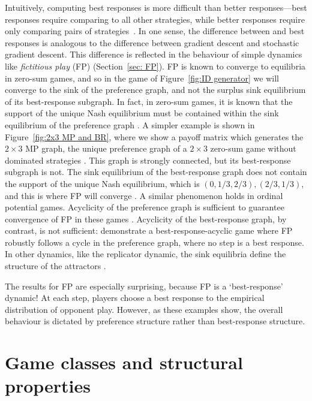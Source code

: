 \documentclass[preprint,authoryear]{elsarticle}
\begin{document}
Intuitively, computing best responses is more difficult than better responses---best responses require comparing to all other strategies, while better responses require only comparing pairs of strategies~\citep{sandholm2010population}. In one sense, the difference between and best responses is analogous to the difference between gradient descent and stochastic gradient descent. This difference is reflected in the behaviour of simple dynamics like \emph{fictitious play} (FP) (Section~\ref{sec: FP}). FP is known to converge to equilibria in zero-sum games, and so in the game of Figure~\ref{fig:ID generator} we will converge to the sink of the preference graph, and not the surplus sink equilibrium of its best-response subgraph. In fact, in zero-sum games, it is known that the support of the unique Nash equilibrium must be contained within the sink equilibrium of the preference graph \citep{biggar_attractor_2024}. A simpler example is shown in Figure~\ref{fig:2x3 MP and BR}, where we show a payoff matrix which generates the $2\times 3$ MP graph, the unique preference graph of a $2\times 3$ zero-sum game without dominated strategies \citep{biggar_graph_2023}. This graph is strongly connected, but its best-response subgraph is not. The sink equilibrium of the best-response graph does not contain the support of the unique Nash equilibrium, which is $(0,1/3,2/3), (2/3,1/3)$, and this is where FP will converge \citep{robinson_iterative_1951}. A similar phenomenon holds in ordinal potential games. Acyclicity of the preference graph is sufficient to guarantee convergence of FP in these games \citep{berger_browns_2007,berger_two_2007}. Acyclicity of the best-response graph, by contrast, is not sufficient: \cite{foster_nonconvergence_1998} demonstrate a best-response-acyclic game where FP robustly follows a cycle in the preference graph, where no step is a best response. In other dynamics, like the replicator dynamic, the sink equilibria define the structure of the attractors \citep{biggar_replicator_2023,biggar_attractor_2024}.

The results for FP are especially surprising, because FP is a `best-response' dynamic! At each step, players choose a best response to the empirical distribution of opponent play. However, as these examples show, the overall behaviour is dictated by preference structure rather than best-response structure.


\section{Game classes and structural properties} \label{sec: structure}
\end{document}
